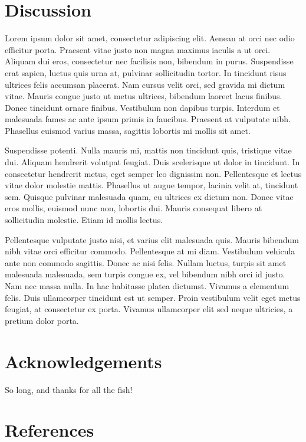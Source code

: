 \documentclass[12pt,]{article}
\begin{document}
\section{Discussion}\label{discussion}

Lorem ipsum dolor sit amet, consectetur adipiscing elit. Aenean at orci
nec odio efficitur porta. Praesent vitae justo non magna maximus iaculis
a ut orci. Aliquam dui eros, consectetur nec facilisis non, bibendum in
purus. Suspendisse erat sapien, luctus quis urna at, pulvinar
sollicitudin tortor. In tincidunt risus ultrices felis accumsan
placerat. Nam cursus velit orci, sed gravida mi dictum vitae. Mauris
congue justo ut metus ultrices, bibendum laoreet lacus finibus. Donec
tincidunt ornare finibus. Vestibulum non dapibus turpis. Interdum et
malesuada fames ac ante ipsum primis in faucibus. Praesent at vulputate
nibh. Phasellus euismod varius massa, sagittis lobortis mi mollis sit
amet.

Suspendisse potenti. Nulla mauris mi, mattis non tincidunt quis,
tristique vitae dui. Aliquam hendrerit volutpat feugiat. Duis
scelerisque ut dolor in tincidunt. In consectetur hendrerit metus, eget
semper leo dignissim non. Pellentesque et lectus vitae dolor molestie
mattis. Phasellus ut augue tempor, lacinia velit at, tincidunt sem.
Quisque pulvinar malesuada quam, eu ultrices ex dictum non. Donec vitae
eros mollis, euismod nunc non, lobortis dui. Mauris consequat libero at
sollicitudin molestie. Etiam id mollis lectus.

Pellentesque vulputate justo nisi, et varius elit malesuada quis. Mauris
bibendum nibh vitae orci efficitur commodo. Pellentesque at mi diam.
Vestibulum vehicula ante non commodo sagittis. Donec ac nisi felis.
Nullam luctus, turpis sit amet malesuada malesuada, sem turpis congue
ex, vel bibendum nibh orci id justo. Nam nec massa nulla. In hac
habitasse platea dictumst. Vivamus a elementum felis. Duis ullamcorper
tincidunt est ut semper. Proin vestibulum velit eget metus feugiat, at
consectetur ex porta. Vivamus ullamcorper elit sed neque ultricies, a
pretium dolor porta.

\section{Acknowledgements}\label{acknowledgements}

So long, and thanks for all the fish!

\section{References}\label{references}
\end{document}
